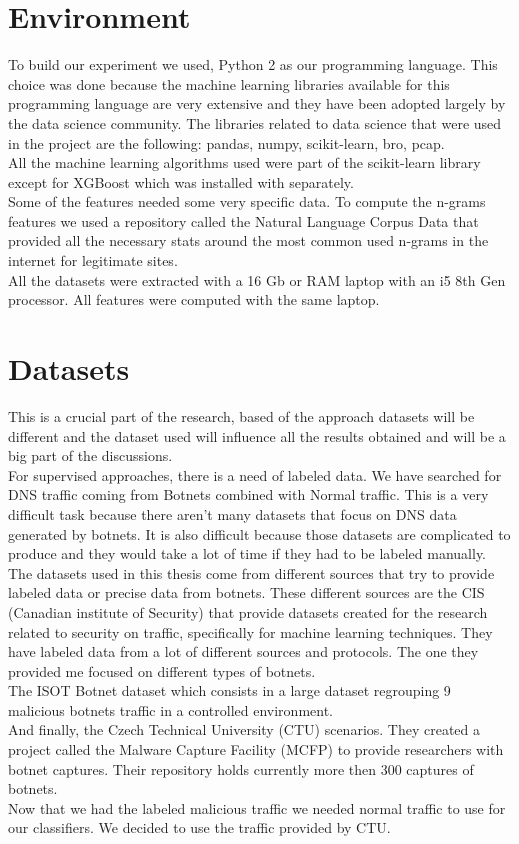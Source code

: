 \section{Environment}
To build our experiment we used, Python 2 as our programming language. This choice was done because the machine learning libraries available for this programming language are very extensive and they have been adopted largely by the data science community. The libraries related to data science that were used in the project are the following: pandas, numpy, scikit-learn, bro, pcap.\\
All the machine learning algorithms used were part of the scikit-learn library except for XGBoost which was installed with separately.
\\
Some of the features needed some very specific data. To compute the n-grams \cite{ngrams} features we used a repository called the Natural Language Corpus Data that provided all the necessary stats around the most common used n-grams in the internet for legitimate sites.
\\
All the datasets were extracted with a 16 Gb or RAM laptop with an i5 8th Gen processor. All features were computed with the same laptop.
\section{Datasets}
This is a crucial part of the research, based of the approach datasets will be different and the dataset used will influence all the results obtained and will be a big part of the discussions.
\\
For supervised approaches, there is a need of labeled data. We have searched for DNS traffic coming from Botnets combined with Normal traffic. This is a very difficult task because there aren't many datasets that focus on DNS data generated by botnets. It is also difficult because those datasets are complicated to produce and they would take a lot of time if they had to be labeled manually.
\\
The datasets used in this thesis come from different sources that try to provide labeled data or precise data from botnets. These different sources are the CIS (Canadian institute of Security) that provide datasets created for the research related to security on traffic, specifically for machine learning techniques. They have labeled data from a lot of different sources and protocols. The one they provided me focused on different types of botnets.\\
The ISOT Botnet dataset \cite{isot} which consists in a large dataset regrouping 9 malicious botnets traffic in a controlled environment. \\
And finally, the Czech Technical University (CTU) scenarios. They created a project called the Malware Capture Facility (MCFP) to provide researchers with botnet captures. Their repository holds currently more then 300 captures of botnets.
\\
Now that we had the labeled malicious traffic we needed normal traffic to use for our classifiers. We decided to use the traffic provided by CTU. 
